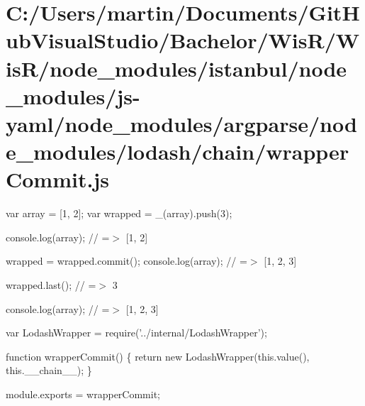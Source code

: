 \hypertarget{_c_1_2_users_2martin_2_documents_2_git_hub_visual_studio_2_bachelor_2_wis_r_2_wis_r_2node_module611d5b6ff884faa8bcfda73e39691f30}{}\section{C\+:/\+Users/martin/\+Documents/\+Git\+Hub\+Visual\+Studio/\+Bachelor/\+Wis\+R/\+Wis\+R/node\+\_\+modules/istanbul/node\+\_\+modules/js-\/yaml/node\+\_\+modules/argparse/node\+\_\+modules/lodash/chain/wrapper\+Commit.\+js}
var array = \mbox{[}1, 2\mbox{]}; var wrapped = \+\_\+(array).push(3);

console.\+log(array); // =$>$ \mbox{[}1, 2\mbox{]}

wrapped = wrapped.\+commit(); console.\+log(array); // =$>$ \mbox{[}1, 2, 3\mbox{]}

wrapped.\+last(); // =$>$ 3

console.\+log(array); // =$>$ \mbox{[}1, 2, 3\mbox{]}


\begin{DoxyCodeInclude}
var LodashWrapper = require(\textcolor{stringliteral}{'../internal/LodashWrapper'});

\textcolor{keyword}{function} wrapperCommit() \{
  \textcolor{keywordflow}{return} \textcolor{keyword}{new} LodashWrapper(this.value(), this.\_\_chain\_\_);
\}

module.exports = wrapperCommit;
\end{DoxyCodeInclude}
 